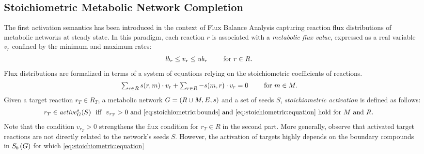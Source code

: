 \subsection{Stoichiometric Metabolic Network Completion}\label{sec:stoichio} %
%
The first activation semantics has been introduced in the context of Flux Balance Analysis
capturing reaction flux distributions of metabolic networks at steady state.
%
In this paradigm, each reaction $r$ is associated with a \emph{metabolic flux value},
expressed as a real variable $v_r$ confined by the minimum and maximum rates:
%
\begin{align} \label{eq:stoichiometric:bounds}
  & \mathit{lb}_r \leq  v_r\leq \mathit{ub}_r \qquad\text{ for } r\in R.
\end{align}
%
Flux distributions are formalized in terms of a system of equations relying on the stoichiometric coefficients of reactions.
%
%
\begin{align}
\label{eq:stoichiometric:equation}
  & \textstyle
    \sum_{\substack{r\in R}}s(r,m)\cdot v_r
    +
    \sum_{\substack{r\in R}}-s(m,r)\cdot v_r
    =
    0
    \qquad \text{ for } m\in M.
\end{align}
%
Given a target reaction $r_T\in R_T$, a metabolic network $G=(R\cup M,E,s)$ and a set of seeds $S$,
\emph{stoichiometric activation} is defined as follows:
\begin{align}%
\label{eq:stoichiometric:activation}
  r_T \in \Activity{s}{G}{S} & \ \text{ iff } \ v_{r_T} >0 \text{ and }
                               \eqref{eq:stoichiometric:bounds} \text{ and } \eqref{eq:stoichiometric:equation}\text{ hold for }M\text{ and }R.
\end{align}%
Note that the condition $v_{r_T} >0$ strengthens the flux condition for $r_T\in R$ in the second part.
More generally, observe that activated target reactions are not directly related to the network's seeds $S$.
However,
the activation of targets highly depends on the boundary compounds in $S_{b}\,(G)$
for which \eqref{eq:stoichiometric:equation} 
